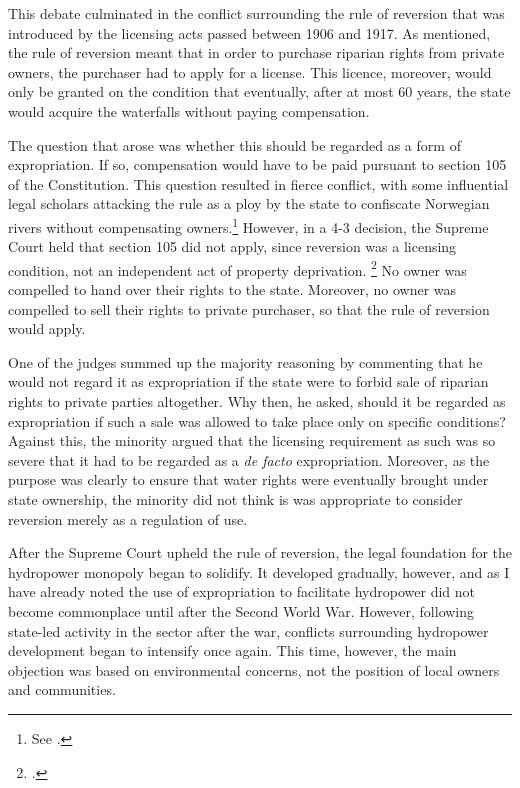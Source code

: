This debate culminated in the conflict surrounding the rule of reversion that was introduced by the licensing acts passed between 1906 and 1917. As mentioned, the rule of reversion meant that in order to purchase riparian rights from private owners, the purchaser had to apply for a license. This licence, moreover, would only be granted on the condition that eventually, after at most 60 years, the state would acquire the waterfalls without paying compensation. 

The question that arose was whether this should be regarded as a form of expropriation. If so, compensation would have to be paid pursuant to section 105 of the Constitution. This question resulted in fierce conflict, with some influential legal scholars attacking the rule as a ploy by the state to confiscate Norwegian rivers  without compensating owners.\footnote{See \cite{morgenstierne14}.} However, in a 4-3 decision, the Supreme Court held that section 105 did not apply, since reversion was a licensing condition, not an independent act of property deprivation. \footcite{johansen18} No owner was compelled to hand over their rights to the state. Moreover, no owner was compelled to sell their rights to private purchaser, so that the rule of reversion would apply.

One of the judges summed up the majority reasoning by commenting that he would not regard it as expropriation if the state were to forbid sale of riparian rights to private parties altogether. Why then, he asked, should it be regarded as expropriation if such a sale was allowed to take place only on specific conditions? Against this, the minority argued that the licensing requirement as such was so severe that it had to be regarded as a {\it de facto} expropriation. Moreover, as the purpose was clearly to ensure that water rights were eventually brought under state ownership, the minority did not think is was appropriate to consider reversion merely as a regulation of use.

After the Supreme Court upheld the rule of reversion, the legal foundation for the hydropower monopoly began to solidify. It developed gradually, however, and as I have already noted the use of expropriation to facilitate hydropower did not become commonplace until after the Second World War. However, following state-led activity in the sector after the war, conflicts surrounding hydropower development began to intensify once again. This time, however, the main objection was based on environmental concerns, not the position of local owners and communities.

